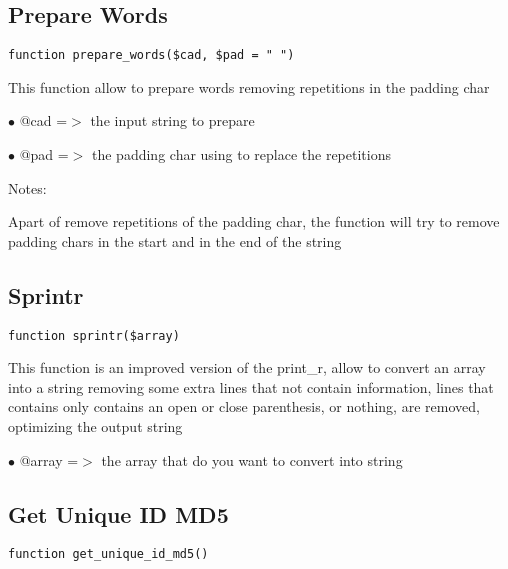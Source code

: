 \documentclass[a4paper]{book}
\begin{document}
\hypertarget{toc272}{}
\subsection{Prepare Words}

\begin{lstlisting}
function prepare_words($cad, $pad = " ")
\end{lstlisting}

This function allow to prepare words removing repetitions in the padding char

\begin{compactitem}
\item[\color{myblue}$\bullet$] @cad =$>$ the input string to prepare
\item[\color{myblue}$\bullet$] @pad =$>$ the padding char using to replace the repetitions
\end{compactitem}

Notes:

Apart of remove repetitions of the padding char, the function will try to
remove padding chars in the start and in the end of the string

\hypertarget{toc273}{}
\subsection{Sprintr}

\begin{lstlisting}
function sprintr($array)
\end{lstlisting}

This function is an improved version of the print\_r, allow to convert an
array into a string removing some extra lines that not contain information,
lines that contains only contains an open or close parenthesis, or nothing,
are removed, optimizing the output string

\begin{compactitem}
\item[\color{myblue}$\bullet$] @array =$>$ the array that do you want to convert into string
\end{compactitem}

\hypertarget{toc274}{}
\subsection{Get Unique ID MD5}

\begin{lstlisting}
function get_unique_id_md5()
\end{lstlisting}
\end{document}
